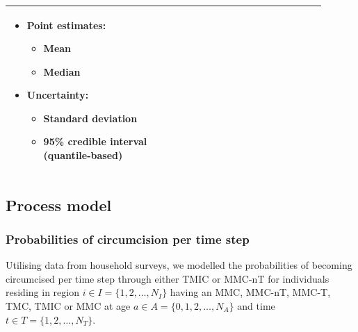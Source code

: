 \documentclass{article}
\begin{document}
\begin{appendix}
{\begin{table}[H]
\begin{tabular}{| p{0.45\linewidth} | p{0.45\linewidth} |}
			\begin{itemize}
				\item Point estimates: 
				\begin{itemize}
					\item Mean 
					\item Median
				\end{itemize}
				\item Uncertainty: 
				\begin{itemize}
					\item Standard deviation
					\item 95\% credible interval (quantile-based)
				\end{itemize}
			\end{itemize}\\
		\hline 
	\end{tabular}
\end{table}}


\subsection{Process model}
\label{sec::competingrisks}


\subsubsection{Probabilities of circumcision per time step}


Utilising data from household surveys, we modelled the probabilities of becoming circumcised per time step through either TMIC or MMC-nT for individuals residing in region $i \in I = \{1, 2, \ldots, N_I\}$ having an MMC, MMC-nT, MMC-T, TMC, TMIC or MMC at age $a \in A = \{0, 1, 2, \ldots, N_A\}$ and time $t \in T = \{1, 2, \ldots, N_T\}$. \\


\end{appendix}
\end{document}
